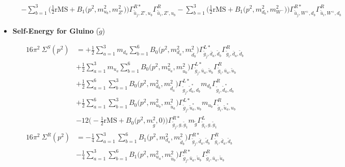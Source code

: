 \begin{itemize}
\begin{align}
 &- \sum_{b=1}^{3}\Big(\frac{1}{2} \text{rMS}  + {B_1\Big(p^{2},m^2_{u_{{b}}},m^2_{{Z'}}\Big)}\Big){\Gamma^{R*}_{\check{\bar{u}}_{{j}},{Z'},u_{{b}}}} {\Gamma^R_{\check{\bar{u}}_{{i}},{Z'},u_{{b}}}}  - \sum_{b=1}^{3}\Big(\frac{1}{2} \text{rMS}  + {B_1\Big(p^{2},m^2_{d_{{b}}},m^2_{W^-}\Big)}\Big){\Gamma^{R*}_{\check{\bar{u}}_{{j}},W^+,d_{{b}}}} {\Gamma^R_{\check{\bar{u}}_{{i}},W^+,d_{{b}}}}   
\end{align} 
\item {\bf Self-Energy for Gluino} \thickspace (\(\tilde{g}\)) 

\begin{align} 
16\pi^2 \ \Sigma^S(p^2) &= +\frac{1}{2} \sum_{a=1}^{3}m_{d_{{a}}} \sum_{b=1}^{6}{B_0\Big(p^{2},m^2_{d_{{a}}},m^2_{\tilde{d}_{{b}}}\Big)} {\Gamma^{L*}_{\tilde{g}_{{j}},\bar{d}_{{a}},\tilde{d}_{{b}}}} {\Gamma^R_{\tilde{g}_{{i}},\bar{d}_{{a}},\tilde{d}_{{b}}}}   \nonumber \\ 
 &+\frac{1}{2} \sum_{a=1}^{3}m_{u_{{a}}} \sum_{b=1}^{6}{B_0\Big(p^{2},m^2_{u_{{a}}},m^2_{\tilde{u}_{{b}}}\Big)} {\Gamma^{L*}_{\tilde{g}_{{j}},\bar{u}_{{a}},\tilde{u}_{{b}}}} {\Gamma^R_{\tilde{g}_{{i}},\bar{u}_{{a}},\tilde{u}_{{b}}}}   \nonumber \\ 
 &+\frac{1}{2} \sum_{a=1}^{6}\sum_{b=1}^{3}{B_0\Big(p^{2},m^2_{d_{{b}}},m^2_{\tilde{d}_{{a}}}\Big)} {\Gamma^{L*}_{\tilde{g}_{{j}},\tilde{d}^*_{{a}},d_{{b}}}} m_{d_{{b}}} {\Gamma^R_{\tilde{g}_{{i}},\tilde{d}^*_{{a}},d_{{b}}}}  \nonumber \\ 
 &+\frac{1}{2} \sum_{a=1}^{6}\sum_{b=1}^{3}{B_0\Big(p^{2},m^2_{u_{{b}}},m^2_{\tilde{u}_{{a}}}\Big)} {\Gamma^{L*}_{\tilde{g}_{{j}},\tilde{u}^*_{{a}},u_{{b}}}} m_{u_{{b}}} {\Gamma^R_{\tilde{g}_{{i}},\tilde{u}^*_{{a}},u_{{b}}}}  \nonumber \\ 
 &-12 \Big(-\frac{1}{2} \text{rMS}  + {B_0\Big(p^{2},m^2_{\tilde{g}},0\Big)}\Big){\Gamma^{R*}_{\tilde{g}_{{j}},g,\tilde{g}_{{1}}}} m_{\tilde{g}} {\Gamma^L_{\tilde{g}_{{i}},g,\tilde{g}_{{1}}}} \\ 
16\pi^2 \ \Sigma^R(p^2) &= -\frac{1}{4} \sum_{a=1}^{3}\sum_{b=1}^{6}{B_1\Big(p^{2},m^2_{d_{{a}}},m^2_{\tilde{d}_{{b}}}\Big)} {\Gamma^{R*}_{\tilde{g}_{{j}},\bar{d}_{{a}},\tilde{d}_{{b}}}} {\Gamma^R_{\tilde{g}_{{i}},\bar{d}_{{a}},\tilde{d}_{{b}}}}  \nonumber \\ 
 &-\frac{1}{4} \sum_{a=1}^{3}\sum_{b=1}^{6}{B_1\Big(p^{2},m^2_{u_{{a}}},m^2_{\tilde{u}_{{b}}}\Big)} {\Gamma^{R*}_{\tilde{g}_{{j}},\bar{u}_{{a}},\tilde{u}_{{b}}}} {\Gamma^R_{\tilde{g}_{{i}},\bar{u}_{{a}},\tilde{u}_{{b}}}}  \nonumber \\ 

\end{align}
\end{itemize}
